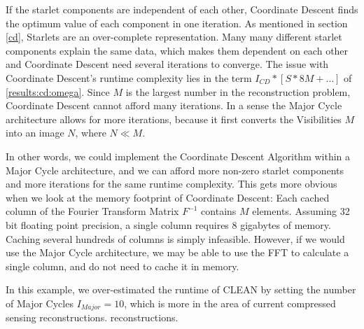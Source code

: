 If the starlet components are independent of each other, Coordinate Descent finds the optimum value of each component in one iteration. As mentioned in section \ref{cd}, Starlets are an over-complete representation. Many many different starlet components explain the same data, which makes them dependent on each other and Coordinate Descent need several iterations to converge. The issue with Coordinate Descent's runtime complexity lies in the term $ I_{CD} * [S * 8M +\ldots]$ of \eqref{results:cd:omega}. Since $M$ is the largest number in the reconstruction problem, Coordinate Descent cannot afford many iterations. In a sense the Major Cycle architecture allows for more iterations, because it first converts the Visibilities $M$ into an image $N$, where $N \ll M$.

In other words, we could implement the Coordinate Descent Algorithm within a Major Cycle architecture, and we can afford more non-zero starlet components and more iterations for the same runtime complexity. This gets more obvious when we look at the memory footprint of Coordinate Descent: Each cached column of the Fourier Transform Matrix $F^{-1}$ contains $M$ elements. Assuming 32 bit floating point precision, a single column requires 8 gigabytes of memory. Caching several hundreds of columns is simply infeasible. However, if we would use the Major Cycle architecture, we may be able to use the FFT to calculate a single column, and do not need to cache it in memory.

In this example, we over-estimated the runtime of CLEAN by setting the number of Major Cycles $I_{Major} = 10$, which is more in the area of current compressed sensing reconstructions. reconstructions. 

